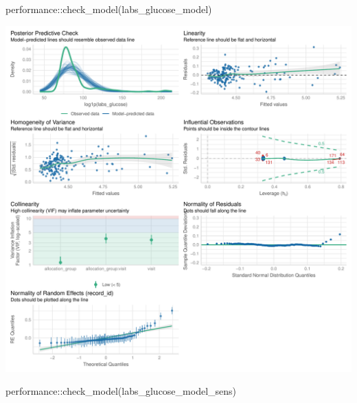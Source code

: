 \documentclass[
  letterpaper,
  DIV=11,
  numbers=noendperiod]{scrartcl}
\newenvironment{Shaded}{\begin{snugshade}}{\end{snugshade}}
\newcommand{\FunctionTok}[1]{\textcolor[rgb]{0.28,0.35,0.67}{#1}}
\newcommand{\NormalTok}[1]{\textcolor[rgb]{0.00,0.23,0.31}{#1}}
\newcommand{\SpecialCharTok}[1]{\textcolor[rgb]{0.37,0.37,0.37}{#1}}
\begin{document}
\begin{Shaded}
\begin{Highlighting}[]
\NormalTok{performance}\SpecialCharTok{::}\FunctionTok{check\_model}\NormalTok{(labs\_glucose\_model)}
\end{Highlighting}
\end{Shaded}

\includegraphics{Outcomes_V1V2V3_files/figure-pdf/labs_glucose_4-1.pdf}

\begin{Shaded}
\begin{Highlighting}[]
\NormalTok{performance}\SpecialCharTok{::}\FunctionTok{check\_model}\NormalTok{(labs\_glucose\_model\_sens)}
\end{Highlighting}
\end{Shaded}
\end{document}
